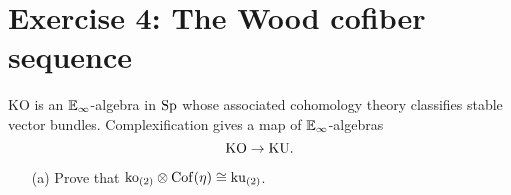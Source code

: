 \documentclass[reqno]{amsart}
\begin{document}
\section{\bf Exercise 4: The Wood cofiber sequence}

$\mathrm{KO}$ is an $\mathbb{E}_\infty$-algebra in $\mathrm{Sp}$ whose associated cohomology theory
classifies stable vector bundles.
Complexification gives a map of $\mathbb{E}_\infty$-algebras
\[ \mathrm{KO} \to \mathrm{KU}. \]

\begin{itemize}
\item[(a)] Prove that $\mathrm{ko}_{(2)} \otimes \mathrm{Cof}(\eta) \cong \mathrm{ku}_{(2)}$.
\end{itemize}


















\end{document}
